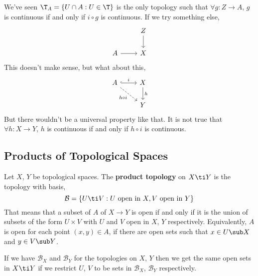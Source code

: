 We've seen $\T_A = \{U \cap A : U \in \T\}$ is the only topology such that $\forall g : Z \to A$, $g$ is continuous if and only if $i \circ g$ is continuous. If we try something else,
\[\begin{tikzcd}
	& Z \\
	A & X
	\arrow[from=1-2, to=2-2]
	\arrow[from=2-1, to=2-2]
\end{tikzcd}\]
This doesn't make sense, but what about this,
\[\begin{tikzcd}
	A & X \\
	& Y
	\arrow["i", hook, from=1-1, to=1-2]
	\arrow["h", from=1-2, to=2-2]
	\arrow["{h \circ i}"', dashed, from=1-1, to=2-2]
\end{tikzcd}\]
But there wouldn't be a universal property like that. It is not true that $\forall h : X \to Y$, $h$ is continuous if and only if $h \circ i$ is continuous.

\subsection{Products of Topological Spaces}

\begin{ndefi}
  Let $X$, $Y$ be topological spaces. The \textbf{product topology} on $X\ti Y$ is the topology with basis,
  $$ \mathcal{B} = \{U \ti V : U \text{ open in } X, V \text{ open in } Y\} $$
  That means that a subset of $A$ of $X\to Y$ is open if and only if it is the union of subsets of the form $U\times V$ with $U$ and $V$ open in $X$, $Y$ respectively. Equivalently, $A$ is open for each point $(x, y) \in A$, if there are open sets such that $x \in U \sub X$ and $y \in V \sub Y$.
\end{ndefi}

\begin{remark}
   If we have $\mathcal{B}_X$ and $\mathcal{B}_Y$ for the topologies on $X$, $Y$ then we get the same open sets in $X\ti Y$ if we restrict $U$, $V$ to be sets in $\mathcal{B}_X$, $\mathcal{B}_Y$ respectively.
\end{remark}

